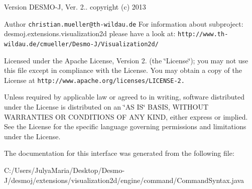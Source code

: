\begin{DoxyVersion}{Version}
D\-E\-S\-M\-O-\/\-J, Ver. 2.. copyright (c) 2013 
\end{DoxyVersion}
\begin{DoxyAuthor}{Author}
{\tt christian.\-mueller@th-\/wildau.\-de} For information about subproject\-: desmoj.\-extensions.\-visualization2d please have a look at\-: {\tt http\-://www.\-th-\/wildau.\-de/cmueller/\-Desmo-\/\-J/\-Visualization2d/}
\end{DoxyAuthor}
Licensed under the Apache License, Version 2. (the \char`\"{}\-License\char`\"{}); you may not use this file except in compliance with the License. You may obtain a copy of the License at {\tt http\-://www.\-apache.\-org/licenses/\-L\-I\-C\-E\-N\-S\-E-\/2.}

Unless required by applicable law or agreed to in writing, software distributed under the License is distributed on an \char`\"{}\-A\-S I\-S\char`\"{} B\-A\-S\-I\-S, W\-I\-T\-H\-O\-U\-T W\-A\-R\-R\-A\-N\-T\-I\-E\-S O\-R C\-O\-N\-D\-I\-T\-I\-O\-N\-S O\-F A\-N\-Y K\-I\-N\-D, either express or implied. See the License for the specific language governing permissions and limitations under the License. 

The documentation for this interface was generated from the following file\-:\begin{DoxyCompactItemize}
\item 
C\-:/\-Users/\-Julya\-Maria/\-Desktop/\-Desmo-\/\-J/desmoj/extensions/visualization2d/engine/command/Command\-Syntax.\-java\end{DoxyCompactItemize}
